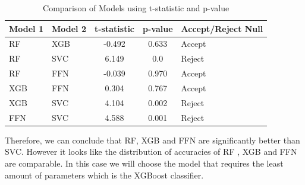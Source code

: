 \documentclass[12pt]{extarticle}
\begin{document}
    \begin{table}[h!]
        \centering
        \caption{Comparison of Models using t-statistic and p-value}
        \begin{tabular}{|l|l|c|c|l|}
            \hline
            \textbf{Model 1} & \textbf{Model 2} & \textbf{t-statistic} & \textbf{p-value} & \textbf{Accept/Reject Null} \\
            \hline
            RF & XGB & -0.492 & 0.633 & Accept \\
            \hline
            RF & SVC & 6.149 & 0.0 & Reject \\
            \hline
            RF & FFN & -0.039 & 0.970 & Accept \\
            \hline
            XGB & FFN & 0.304 & 0.767 & Accept \\
            \hline
            XGB & SVC & 4.104 & 0.002 & Reject \\
            \hline
            FFN & SVC & 4.588 & 0.001 & Reject \\
            \hline
        \end{tabular}
    \end{table}
Therefore, we can conclude that RF, XGB and FFN are significantly better than SVC. However it looks like the distribution of accuracies of RF , XGB and FFN are comparable. In this case we will choose the model that requires the least amount of parameters which is the XGBoost classifier.
\end{document}
